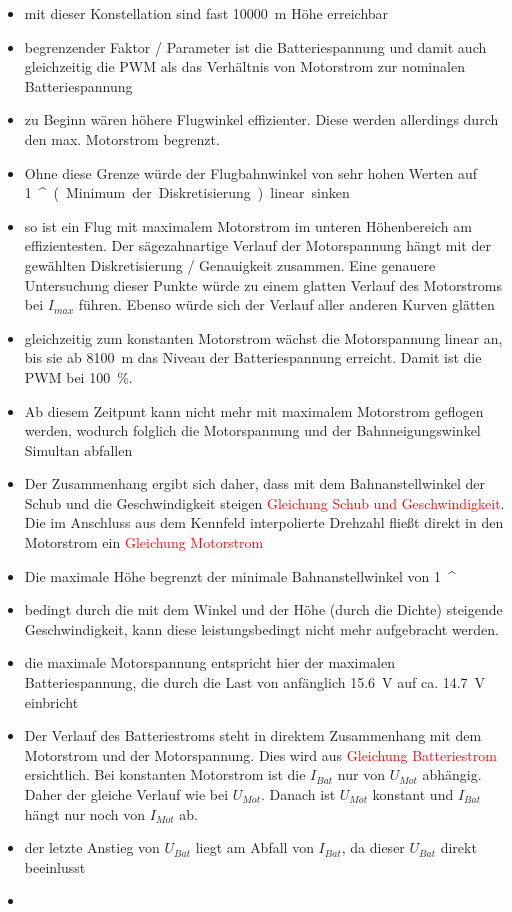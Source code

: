 \begin{itemize}
	\item mit dieser Konstellation sind fast \SI{10000}{m} Höhe erreichbar
	\item begrenzender Faktor / Parameter ist die Batteriespannung und damit auch gleichzeitig die PWM als das Verhältnis von Motorstrom zur nominalen Batteriespannung 
	\item zu Beginn wären höhere Flugwinkel effizienter. Diese werden allerdings durch den max. Motorstrom begrenzt. 
	\item Ohne diese Grenze würde der Flugbahnwinkel von sehr hohen Werten auf \SI{1}{^\circ} (Minimum der Diskretisierung) linear sinken
	\item so ist ein Flug mit maximalem Motorstrom im unteren Höhenbereich am effizientesten. Der sägezahnartige Verlauf der Motorspannung hängt mit der gewählten Diskretisierung / Genauigkeit zusammen. Eine genauere Untersuchung dieser Punkte würde zu einem glatten Verlauf des Motorstroms bei \ensuremath{I_{max}} führen. Ebenso würde sich der Verlauf aller anderen Kurven glätten
	\item gleichzeitig zum konstanten Motorstrom wächst die Motorspannung linear an, bis sie ab \SI{8100}{m} das Niveau der Batteriespannung erreicht. Damit ist die PWM bei \SI{100}{\%}.
	\item Ab diesem Zeitpunt kann nicht mehr mit maximalem Motorstrom geflogen werden, wodurch folglich die Motorspannung und der Bahnneigungswinkel Simultan abfallen
	\item Der Zusammenhang ergibt sich daher, dass mit dem Bahnanstellwinkel der Schub und die Geschwindigkeit steigen \textcolor{red}{Gleichung Schub und  Geschwindigkeit}. Die im Anschluss aus dem Kennfeld interpolierte Drehzahl fließt direkt in den Motorstrom ein \textcolor{red}{Gleichung Motorstrom}
	\item Die maximale Höhe begrenzt der minimale Bahnanstellwinkel von \SI{1}{^\circ}
	\item bedingt durch die mit dem Winkel und der Höhe (durch die Dichte) steigende Geschwindigkeit, kann diese leistungsbedingt nicht mehr aufgebracht werden.
	\item die maximale Motorspannung entspricht hier der maximalen Batteriespannung, die durch die Last von anfänglich \SI{15,6}{V} auf ca. \SI{14.7}{V} einbricht
	\item Der Verlauf des Batteriestroms steht in direktem Zusammenhang mit dem Motorstrom und der Motorspannung. Dies wird aus \textcolor{red}{Gleichung Batteriestrom} ersichtlich. Bei konstanten Motorstrom ist die \ensuremath{I_{Bat}} nur von \ensuremath{U_{Mot}} abhängig. Daher der gleiche Verlauf wie bei \ensuremath{U_{Mot}}. Danach ist \ensuremath{U_{Mot}} konstant und \ensuremath{I_{Bat}} hängt nur noch von \ensuremath{I_{Mot}} ab.
	\item der letzte Anstieg von \ensuremath{U_{Bat}} liegt am Abfall von \ensuremath{I_{Bat}}, da dieser \ensuremath{U_{Bat}} direkt beeinlusst
	\item 
\end{itemize}


